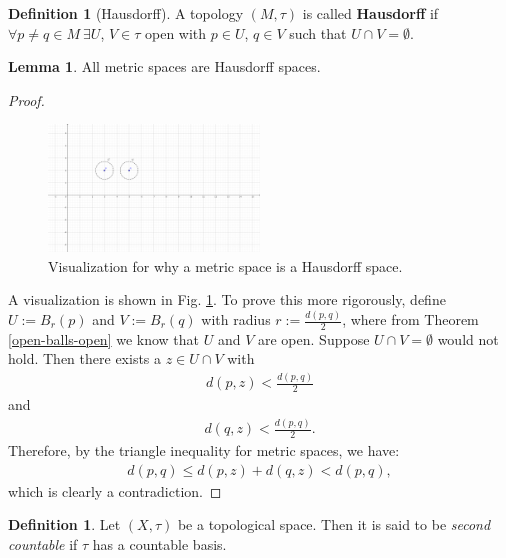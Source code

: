 \documentclass[12pt, a4paper]{article}
\numberwithin{equation}{section}
\theoremstyle{definition}
\theoremstyle{definition}
\newtheorem{defn}[thm]{Definition} %
\newtheorem{lemma}[thm]{Lemma} %
\begin{document}
		\begin{defn}[Hausdorff]
			A topology $\left(M, \tau\right)$ is called \textbf{Hausdorff} if $\forall p\ne q \in M \ \exists U$, $V\in \tau$ open with $p\in U$, $q\in V$ such that $U\cap V = \emptyset$.  
		\end{defn} 
		
		\begin{lemma}
			All metric spaces are Hausdorff spaces. 
		\end{lemma}
		
		\begin{proof}
			\begin{figure}[h!]		
				\centering 
				\includegraphics[trim = {3.8cm 5.8cm 9.7cm 2.8cm}, width=0.5\textwidth, clip]{Figures/metric-spaces-Hausdorff-spaces-v2.png}
				\caption{Visualization for why a metric space is a Hausdorff space.}
				\label{metric-space-Hausdorff-space}
			\end{figure} 
			A visualization is shown in Fig. \ref{metric-space-Hausdorff-space}. To prove this more rigorously, define $U := B_{r}(p)$ and $V:=B_{r}(q)$ with radius $r := \frac{d(p, q)}{2}$, where from Theorem \ref{open-balls-open} we know that $U$ and $V$ are open. Suppose $U\cap V = \emptyset$ would not hold. Then there exists a $z\in U\cap V$ with 
			\begin{align}
				d(p, z) < \frac{d(p, q)}{2}
			\end{align}
			and 
			\begin{align}
				d(q, z) < \frac{d(p, q)}{2}. 
			\end{align}
			Therefore, by the triangle inequality for metric spaces, we have: 
			\begin{align}
				d(p, q) \leq d(p, z) + d(q, z) < d(p, q), 
			\end{align}
			which is clearly a contradiction. 
		\end{proof}
		
		\begin{defn}
			Let $(X, \tau)$ be a topological space. Then it is said to be \textit{second countable} if $\tau$ has a countable basis. 
		\end{defn}
		
\end{document}
